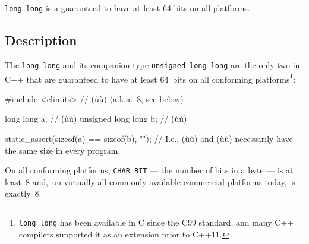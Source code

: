 
\setcounter{table}{0}
\setcounter{footnote}{0}
\setcounter{lstlisting}{0}


\lstinline!long!~\lstinline!long! is a  guaranteed to have at least 64 bits on all
platforms.

\subsection[Description]{Description}\label{description}

The  \lstinline!long!~\lstinline!long! and its companion
type \lstinline!unsigned!~\lstinline!long!~\lstinline!long! are the only two
 in C++ that are guaranteed to have
at least 64~bits on all conforming platforms{\cprotect\footnote{\lstinline!long!~\lstinline!long!
has been available in C since the C99 standard, and many C++ compilers
  supported it as an extension prior to C++11.}}:

\begin{emcppslisting}
#include <climits>  // (ù{}ù) (a.k.a.~8, see below)

long long          a;  // (ù{}ù)
unsigned long long b;  // (ù{}ù)

static_assert(sizeof(a) == sizeof(b), "");
    // I.e., (ù{}ù) and (ù{}ù) necessarily have the same size in every program.
\end{emcppslisting}

\noindent On all conforming platforms, \lstinline!CHAR_BIT! --- the number of bits
in a byte --- is at least~8 and,~on virtually all commonly available
commercial platforms today, is exactly~8.

